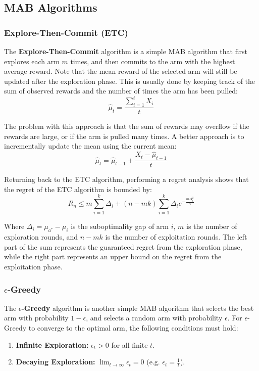 \documentclass[12pt]{article}
\begin{document}
\subsection{MAB Algorithms}
\subsubsection{Explore-Then-Commit (ETC)}
The \textbf{Explore-Then-Commit} algorithm is a simple MAB algorithm that first explores each arm $m$ times, and then commits to the arm with the highest average reward.
Note that the mean reward of the selected arm will still be updated after the exploration phase.
This is usually done by keeping track of the sum of observed rewards and the number of times the arm has been pulled:
\[ \hat{\mu}_t = \frac{\displaystyle\sum_{i = 1}^t X_i}{t} \]

\noindent
The problem with this approach is that the sum of rewards may overflow if the rewards are large, or if the arm is pulled many times.
A better approach is to incrementally update the mean using the current mean:
\[ \hat{\mu}_t = \hat{\mu}_{t - 1} + \frac{X_t - \hat{\mu}_{t - 1}}{t} \]

\newpage
\noindent
Returning back to the ETC algorithm, performing a regret analysis shows that the regret of the ETC algorithm is bounded by:
\[ R_n \leq m \sum_{i = 1}^k \Delta_i + (n - mk) \sum_{i = 1}^k \Delta_i e^{\displaystyle-\frac{m\Delta_i^2}{4}} \]

\noindent
Where $\Delta_i = \mu_{a^*} - \mu_i$ is the suboptimality gap of arm $i$, $m$ is the number of exploration rounds, and $n - mk$ is the number of exploitation rounds.
The left part of the sum represents the guaranteed regret from the exploration phase, while the right part represents an upper bound on the regret from the exploitation phase.

\subsubsection{$\epsilon$-Greedy}
The \textbf{$\epsilon$-Greedy} algorithm is another simple MAB algorithm that selects the best arm with probability $1 - \epsilon$, and selects a random arm with probability $\epsilon$.
For $\epsilon$-Greedy to converge to the optimal arm, the following conditions must hold:

\begin{enumerate}
    \item \textbf{Infinite Exploration:} $\epsilon_t > 0$ for all finite $t$.
    \item \textbf{Decaying Exploration:} $\displaystyle \lim_{t \rightarrow \infty} \epsilon_t = 0$ (e.g. $\epsilon_t = \frac{1}{t}$).
\end{enumerate}
\end{document}
